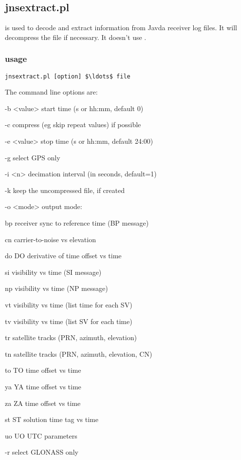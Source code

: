 \subsection{jnsextract.pl}
\hypertarget{h:jnsextract}{}

 is used to decode and extract information from Javda receiver log files. 
It will decompress the file if necessary.
It doesn't use . 

\subsubsection{usage}

\begin{lstlisting}[mathescape=true]
jnsextract.pl [option] $\ldots$ file
\end{lstlisting}

The command line options are:
\begin{description*}

	\item[-b \textless{value}\textgreater]  start time (s or hh:mm, default 0)
	\item[-c] compress (eg skip repeat values) if possible
	\item[-e \textless{value}\textgreater]  stop time (s or hh:mm, default 24:00)
	\item[-g] select GPS only
	\item[-i \textless{n}\textgreater]  decimation interval (in seconds, default=1)
	\item[-k]  keep the uncompressed file, if created
	\item[-o \textless{mode}\textgreater] output mode:
		\begin{description*}
			\item[bp]  receiver sync to reference time (BP message)
			\item[cn]  carrier-to-noise vs elevation
			\item[do]  DO derivative of time offset vs time
			\item[si]  visibility vs time (SI message)
			\item[np]  visibility vs time (NP message)
			\item[vt]  visibility vs time (list time for each SV)
			\item[tv]  visibility vs time (list SV for each time)
			\item[tr]  satellite tracks (PRN, azimuth, elevation)
			\item[tn]  satellite tracks (PRN, azimuth, elevation, CN)
			\item[to]  TO time offset vs time
			\item[ya]  YA time offset vs time
			\item[za]  ZA time offset vs time
			\item[st]  ST solution time tag vs time
			\item[uo]  UO UTC parameters
		\end{description*}
	\item[-r]    select GLONASS only

\end{description*}

